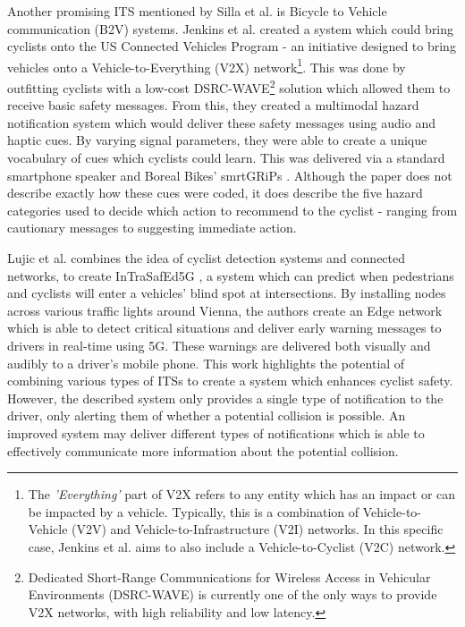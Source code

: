 \documentclass{interim}
\begin{document}
Another promising ITS mentioned by Silla et al. \cite{SILLA2017134} is Bicycle to Vehicle communication (B2V) systems. Jenkins et al. created a system which could bring cyclists onto the US Connected Vehicles Program \cite{usdot} - an initiative designed to bring vehicles onto a Vehicle-to-Everything (V2X) network\footnote{The \textit{'Everything'} part of V2X refers to any entity which has an impact or can be impacted by a vehicle. Typically, this is a combination of Vehicle-to-Vehicle (V2V) and Vehicle-to-Infrastructure (V2I) networks. In this specific case, Jenkins et al. aims to also include a Vehicle-to-Cyclist (V2C) network.}. This was done by outfitting cyclists with a low-cost DSRC-WAVE\footnote{Dedicated Short-Range Communications for Wireless Access in Vehicular Environments (DSRC-WAVE) is currently one of the only ways to provide V2X networks, with high reliability and low latency.} solution which allowed them to receive basic safety messages. From this, they created a multimodal hazard notification system which would deliver these safety messages using audio and haptic cues. By varying signal parameters, they were able to create a unique vocabulary of cues which cyclists could learn. This was delivered via a standard smartphone speaker and Boreal Bikes’ smrtGRiPs \cite{smartgrips}. Although the paper does not describe exactly how these cues were coded, it does describe the five hazard categories used to decide which action to recommend to the cyclist - ranging from cautionary messages to suggesting immediate action.

Lujic et al. combines the idea of cyclist detection systems and connected networks, to create InTraSafEd5G \cite{10.1145/3434770.3459732}, a system which can predict when pedestrians and cyclists will enter a vehicles' blind spot at intersections. By installing nodes across various traffic lights around Vienna, the authors create an Edge network which is able to detect critical situations and deliver early warning messages to drivers in real-time using 5G. These warnings are delivered both visually and audibly to a driver’s mobile phone. This work highlights the potential of combining various types of ITSs to create a system which enhances cyclist safety. However, the described system only provides a single type of notification to the driver, only alerting them of whether a potential collision is possible. An improved system may deliver different types of notifications which is able to effectively communicate more information about the potential collision.
\end{document}
